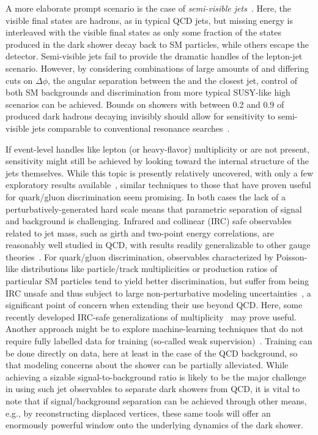 \begin{enumerate}
A more elaborate prompt scenario is the case of  \emph{semi-visible jets}~\cite{Cohen:2015toa}.  Here, the visible final states are hadrons, as in typical QCD jets, but missing energy is interleaved with the visible final states as only some fraction of the states produced in the dark shower decay back to SM particles, while others escape the detector. Semi-visible jets fail to provide the dramatic handles of the lepton-jet scenario. However, by considering combinations of large amounts of \MET and differing cuts on $\Delta\phi$, the angular separation between the \MET and the closest jet, control of both SM backgrounds and discrimination from more typical SUSY-like high \MET scenarios can be achieved. Bounds on showers with between 0.2 and 0.9 of produced dark hadrons decaying invisibly should allow for sensitivity to semi-visible jets comparable to conventional resonance searches~\cite{Cohen:2017pzm}.

If event-level handles like lepton (or heavy-flavor) multiplicity or \MET are not present, sensitivity might still be achieved by looking toward the internal structure of the jets themselves. While this topic is presently relatively uncovered, with only a few exploratory results available~\cite{Park:2017rfb}, similar techniques to those that have proven useful for quark/gluon discrimination seem promising. In both cases the lack of a perturbatively-generated hard scale means that parametric separation of signal and background is challenging. Infrared and collinear (IRC) safe observables related to jet mass, such as girth and two-point energy correlations, are reasonably well studied in QCD, with results readily generalizable to other gauge theories~\cite{Gallicchio:2010dq,Larkoski:2013eya,Larkoski:2014gra}. For quark/gluon discrimination, observables characterized by Poisson-like distributions like particle/track multiplicities or production ratios of particular SM particles tend to yield better discrimination, but suffer from being IRC unsafe and thus subject to large non-perturbative modeling uncertainties~\cite{Gras:2017jty}, a significant point of concern when extending their use beyond QCD. Here, some recently developed IRC-safe generalizations of multiplicity~\cite{Frye:2017yrw} may prove useful.  Another approach might be to explore machine-learning techniques that do not require fully labelled data for training (so-called weak supervision)~\cite{Dery:2017fap,Cohen:2017exh,Metodiev:2017vrx}.  Training can be done directly on data, here at least in the case of the QCD background, so that modeling concerns about the shower can be partially alleviated.  While achieving a sizable signal-to-background ratio is likely to be the major challenge in using such jet observables to separate dark showers from QCD, it is vital to note that if signal/background separation can be achieved through other means, e.g., by reconstructing displaced vertices, these same tools will offer an enormously powerful window onto the underlying dynamics of the dark shower.




\end{enumerate}
